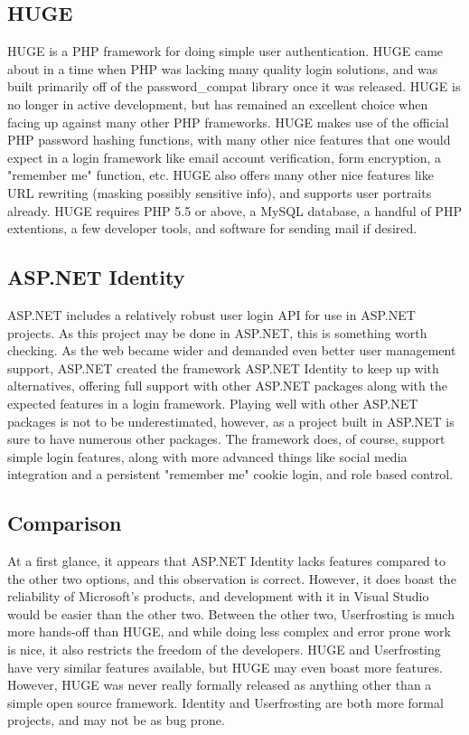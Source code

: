 \documentclass[onecolumn, draftclsnofoot,10pt, compsoc]{IEEEtran}
\begin{document}
\subsection{HUGE}
HUGE is a PHP framework for doing simple user authentication. HUGE came about in a time when PHP was lacking many quality login solutions, and was built
primarily off of the password\_compat library once it was released. HUGE is no longer in active development, but has remained an excellent choice when facing 
up against many other PHP frameworks. HUGE makes use of the official PHP password hashing functions, with many other nice features that one would expect in a 
login framework like email account verification, form encryption, a "remember me" function, etc. HUGE also offers many other nice features like URL rewriting 
(masking possibly sensitive info), and supports user portraits already. HUGE requires PHP 5.5 or above, a MySQL database, a handful of PHP extentions, a few 
developer tools, and software for sending mail if desired.
\subsection{ASP.NET Identity}
ASP.NET includes a relatively robust user login API for use in ASP.NET projects. As this project may be done in ASP.NET, this is something worth checking. As the web
became wider and demanded even better user management support, ASP.NET created the framework ASP.NET Identity to keep up with alternatives, offering full support with
other ASP.NET packages along with the expected features in a login framework. Playing well with other ASP.NET packages is not to be underestimated, however, as a project 
built in ASP.NET is sure to have numerous other packages. The framework does, of course, support simple login features, along with more advanced things like social media 
integration and a persistent "remember me" cookie login, and role based control.
\subsection{Comparison}
At a first glance, it appears that ASP.NET Identity lacks features compared to the other two options, and this observation is correct. However, it does boast the reliability of
Microsoft's products, and development with it in Visual Studio would be easier than the other two. Between the other two, Userfrosting is much more hands-off than HUGE, and 
while doing less complex and error prone work is nice, it also restricts the freedom of the developers. HUGE and Userfrosting have very similar features available, but HUGE may 
even boast more features. However, HUGE was never really formally released as anything other than a simple open source framework. Identity and Userfrosting are both more formal 
projects, and may not be as bug prone.
\end{document}
